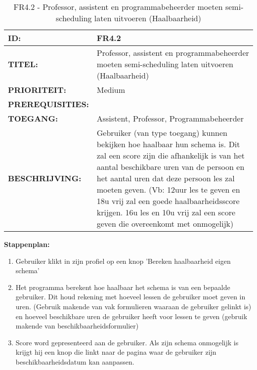 \noindent\begin{table}[H]
	\begin{tabular}{l | p{10cm}}
    \textbf{ID:} & FR4.2 \\ \hline
    \textbf{TITEL:} & Professor, assistent en programmabeheerder moeten semi-scheduling laten uitvoeren (Haalbaarheid)\\ \hline
    \textbf{PRIORITEIT:} &  Medium \\ \hline
    \textbf{PREREQUISITIES:} & \\ \hline
    \textbf{TOEGANG:} & Assistent, Professor, Programmabeheerder \\ \hline
    \textbf{BESCHRIJVING:} & Gebruiker (van type toegang) kunnen bekijken hoe haalbaar hun schema is. Dit zal een score zijn die afhankelijk is van het aantal beschikbare uren van de persoon en het aantal uren dat deze persoon les zal moeten geven. (Vb: 12uur les te geven en 18u vrij zal een goede haalbaarheidsscore krijgen. 16u les en 10u vrij zal een score geven die overeenkomt met onmogelijk)\\
    \end{tabular}
    \caption{FR4.2 - Professor, assistent en programmabeheerder moeten semi-scheduling laten uitvoeren (Haalbaarheid)}
    \label{tab:FR4.2 - Professor, assistent en programmabeheerder moeten semi-scheduling laten uitvoeren (Haalbaarheid)}
\end{table}

\textbf{Stappenplan:}
	\begin{enumerate}
	\item Gebruiker klikt in zijn profiel op een knop 'Bereken haalbaarheid eigen schema'
	\item Het programma berekent hoe haalbaar het schema is van een bepaalde gebruiker. Dit houd rekening met hoeveel lessen de gebruiker moet geven in uren. (Gebruik makende van vak formulieren waaraan de gebruiker gelinkt is) en hoeveel beschikbare uren de gebruiker heeft voor lessen te geven (gebruik makende van beschikbaarheidsformulier)
	\item Score word gepresenteerd aan de gebruiker. Als zijn schema onmogelijk is krijgt hij een knop die linkt naar de pagina waar de gebruiker zijn beschikbaarheidsdatum kan aanpassen.
	\end{enumerate}
        
        
        
